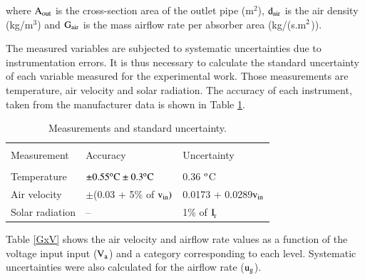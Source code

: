 \noindent where $\rm{A_{out}}$ is the cross-section area of the outlet pipe (m$^2$), $\rm{d_{air}}$ is the air density (kg/m$^3$) and  $\rm{G_{air}}$ is the mass airflow rate per absorber area (kg/(s.m$^{{\rm{2}}}$)).

The measured variables are subjected to systematic uncertainties due to instrumentation errors. It is thus necessary to calculate the standard uncertainty of each variable measured for the experimental work. Those measurements are temperature, air velocity and solar radiation. The accuracy of each instrument, taken from the manufacturer data is shown in Table \ref{uncertainty}.   

\begin{table}[!ht]
	\caption{Measurements and standard uncertainty.}
	\centering
	\begin{tabular}{p{3.0cm}p{3.5cm}p{3.5cm}}
		\hline \\[-10pt] 
		\rule[-1ex]{0pt}{2.5ex} Measurement & Accuracy & Uncertainty \\ [3pt]
		\hline \\[-10pt]
		\rule[-1ex]{0pt}{2.5ex} Temperature & ${\rm \pm0.55 ^{\rm o}C \pm0.3 ^{\rm o}C}$ & 0.36 $^{\rm o}$C \\ [5pt]
		\rule[-1ex]{0pt}{2.5ex} Air velocity &  $\pm$(0.03 + 5\% of ${\rm v_{in})}$ & 0.0173 + 0.0289${\rm v_{in}}$ \\ [5pt] 
		\rule[-1ex]{0pt}{2.5ex} Solar radiation & -- & 1\% of ${\rm I_{\!_T}}$ \\ [2pt]
		\hline 
	\end{tabular}
	\label{uncertainty}
	
\end{table}


\newpage
Table \ref{GxV} shows the air velocity and airflow rate values as a function of the voltage input input ($\rm{V_a}$) and a category corresponding to each level. Systematic uncertainties were also calculated for the airflow rate (${\rm u_g}$).

